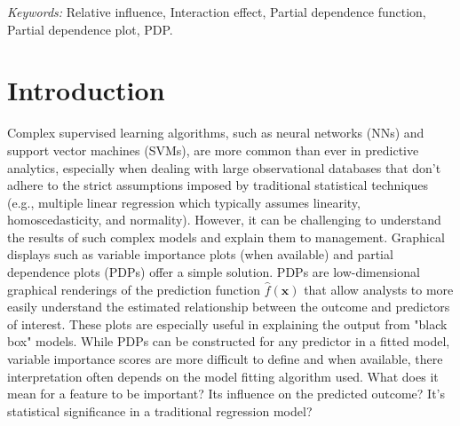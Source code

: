 \documentclass[12pt]{article}
\begin{document}
\noindent%
{\it Keywords:} Relative influence, Interaction effect, Partial dependence function, Partial dependence plot, PDP.
\vfill

\newpage
{} %


\section{Introduction}
\label{sec:introduction}

Complex supervised learning algorithms, such as neural networks (NNs) and support vector machines (SVMs), are more common than ever in predictive analytics, especially when dealing with large observational databases that don't adhere to the strict assumptions imposed by traditional statistical techniques (e.g., multiple linear regression which typically assumes linearity, homoscedasticity, and normality). However, it can be challenging to understand the results of such complex models and explain them to management. Graphical displays such as variable importance plots (when available) and partial dependence plots (PDPs) offer a simple solution. 
PDPs are low-dimensional graphical renderings of the prediction function $\widehat{f}\left(\boldsymbol{x}\right)$ that allow analysts to more easily understand the estimated relationship between the outcome and predictors of interest. These plots are especially useful in explaining the output from "black box" models. While PDPs can be constructed for any predictor in a fitted model, variable importance scores are more difficult to define and when available, there interpretation often depends on the model fitting algorithm used. What does it mean for a feature to be important? Its influence on the predicted outcome? It's statistical significance in a traditional regression model? 
\end{document}
